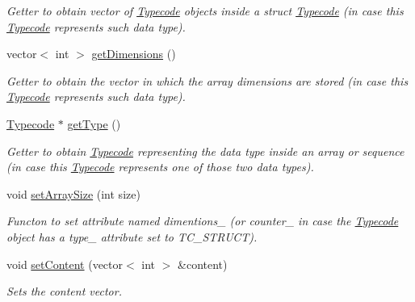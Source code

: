 \begin{DoxyCompactItemize}
\begin{DoxyCompactList}\small\item\em Getter to obtain vector of \hyperlink{class_dynamic_fast_buffers_1_1_typecode}{Typecode} objects inside a struct \hyperlink{class_dynamic_fast_buffers_1_1_typecode}{Typecode} (in case this \hyperlink{class_dynamic_fast_buffers_1_1_typecode}{Typecode} represents such data type). \end{DoxyCompactList}\item 
vector$<$ int $>$ \hyperlink{class_dynamic_fast_buffers_1_1_typecode_a6c3cbc2256046122a36410aff98850d6}{get\-Dimensions} ()
\begin{DoxyCompactList}\small\item\em Getter to obtain the vector in which the array dimensions are stored (in case this \hyperlink{class_dynamic_fast_buffers_1_1_typecode}{Typecode} represents such data type). \end{DoxyCompactList}\item 
\hyperlink{class_dynamic_fast_buffers_1_1_typecode}{Typecode} $\ast$ \hyperlink{class_dynamic_fast_buffers_1_1_typecode_a4430b88b9d08d8dd37629c15cc8bc0e2}{get\-Type} ()
\begin{DoxyCompactList}\small\item\em Getter to obtain \hyperlink{class_dynamic_fast_buffers_1_1_typecode}{Typecode} representing the data type inside an array or sequence (in case this \hyperlink{class_dynamic_fast_buffers_1_1_typecode}{Typecode} represents one of those two data types). \end{DoxyCompactList}\item 
void \hyperlink{class_dynamic_fast_buffers_1_1_typecode_a80d545f918acfa970abdbdc3eeb71b61}{set\-Array\-Size} (int size)
\begin{DoxyCompactList}\small\item\em Functon to set attribute named dimentions\-\_\- (or counter\-\_\- in case the \hyperlink{class_dynamic_fast_buffers_1_1_typecode}{Typecode} object has a type\-\_\- attribute set to T\-C\-\_\-\-S\-T\-R\-U\-C\-T). \end{DoxyCompactList}\item 
void \hyperlink{class_dynamic_fast_buffers_1_1_typecode_a967dc0024a54e2d51bb6e2f2e8a2db88}{set\-Content} (vector$<$ int $>$ \&content)
\begin{DoxyCompactList}\small\item\em Sets the content vector. \end{DoxyCompactList}\item 

\end{DoxyCompactItemize}
